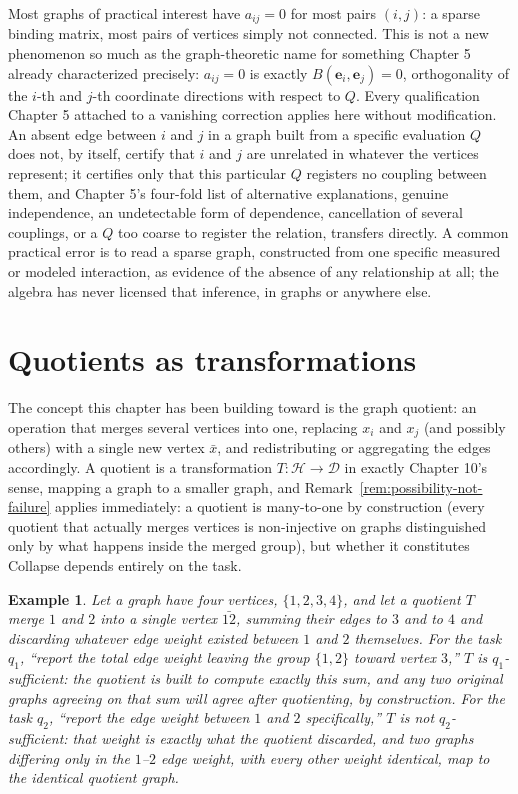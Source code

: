 \documentclass[11pt]{book}
\newtheorem{example}[theorem]{Example}
\begin{document}
Most graphs of practical interest have $a_{ij}=0$ for most pairs $(i,j)$: a sparse binding matrix, most pairs of vertices simply not connected. This is not a new phenomenon so much as the graph-theoretic name for something Chapter 5 already characterized precisely: $a_{ij}=0$ is exactly $B(\mathbf{e}_i,\mathbf{e}_j)=0$, orthogonality of the $i$-th and $j$-th coordinate directions with respect to $Q$. Every qualification Chapter 5 attached to a vanishing correction applies here without modification. An absent edge between $i$ and $j$ in a graph built from a specific evaluation $Q$ does not, by itself, certify that $i$ and $j$ are unrelated in whatever the vertices represent; it certifies only that this particular $Q$ registers no coupling between them, and Chapter 5's four-fold list of alternative explanations, genuine independence, an undetectable form of dependence, cancellation of several couplings, or a $Q$ too coarse to register the relation, transfers directly. A common practical error is to read a sparse graph, constructed from one specific measured or modeled interaction, as evidence of the absence of any relationship at all; the algebra has never licensed that inference, in graphs or anywhere else.

\section{Quotients as transformations}

The concept this chapter has been building toward is the graph quotient: an operation that merges several vertices into one, replacing $x_i$ and $x_j$ (and possibly others) with a single new vertex $\bar x$, and redistributing or aggregating the edges accordingly. A quotient is a transformation $T:\mathcal H\to\mathcal D$ in exactly Chapter 10's sense, mapping a graph to a smaller graph, and Remark~\ref{rem:possibility-not-failure} applies immediately: a quotient is many-to-one by construction (every quotient that actually merges vertices is non-injective on graphs distinguished only by what happens inside the merged group), but whether it constitutes Collapse depends entirely on the task.

\begin{example}
Let a graph have four vertices, $\{1,2,3,4\}$, and let a quotient $T$ merge $1$ and $2$ into a single vertex $\bar{12}$, summing their edges to $3$ and to $4$ and discarding whatever edge weight existed between $1$ and $2$ themselves. For the task $q_1$, ``report the total edge weight leaving the group $\{1,2\}$ toward vertex $3$,'' $T$ is $q_1$-sufficient: the quotient is built to compute exactly this sum, and any two original graphs agreeing on that sum will agree after quotienting, by construction. For the task $q_2$, ``report the edge weight between $1$ and $2$ specifically,'' $T$ is not $q_2$-sufficient: that weight is exactly what the quotient discarded, and two graphs differing only in the $1$--$2$ edge weight, with every other weight identical, map to the identical quotient graph.
\end{example}
\end{document}
